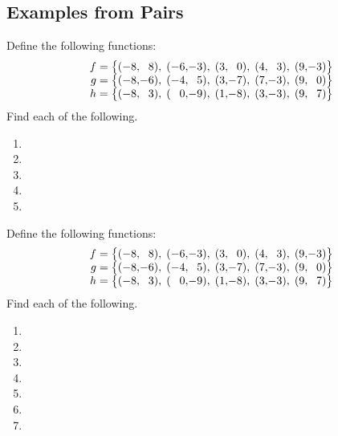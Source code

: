 \subsection{Examples from Pairs} 
\begin{Example}
Define the following functions:
\[
\begin{array}{r@{\;=\big\{(}r@{,}r@{),\;(}r@{,}r@{),\;(}r@{,}r@{),\;(}r@{,}r@{),\;(}r@{,}r@{)\big\}}}
f&-8&8&-6&-3&3&0&4&3&9&-3\\
g&-8&-6&-4&5&3&-7&7&-3&9&0\\
h&-8&3&0&-9&1&-8&3&-3&9&7\\
\end{array}
\]
Find each of the following.
\begin{enumerate}\setabc
\item{}
\item{}
\item{}
\item{}
\item{}
\end{enumerate}
\end{Example}
\begin{Example}
Define the following functions:
\[
\begin{array}{r@{\;=\big\{(}r@{,}r@{),\;(}r@{,}r@{),\;(}r@{,}r@{),\;(}r@{,}r@{),\;(}r@{,}r@{)\big\}}}
f&-8&8&-6&-3&3&0&4&3&9&-3\\
g&-8&-6&-4&5&3&-7&7&-3&9&0\\
h&-8&3&0&-9&1&-8&3&-3&9&7\\
\end{array}
\]
Find each of the following.
\begin{enumerate}\setabc
\item{}
\item{}
\item{}
\item{}
\item{}
\item{}
\item{}
\end{enumerate}
\end{Example}
